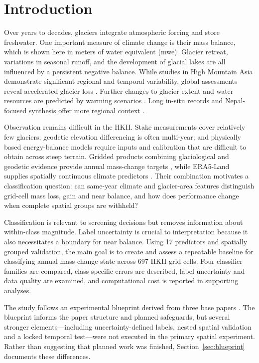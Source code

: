 \documentclass[conference]{IEEEtran}
\begin{document}
\section{Introduction}
Over years to decades, glaciers integrate atmospheric forcing and store freshwater. One important measure of climate change is their mass balance, which is shown here in meters of water equivalent (mwe). Glacier retreat, variations in seasonal runoff, and the development of glacial lakes are all influenced by a persistent negative balance. While studies in High Mountain Asia demonstrate significant regional and temporal variability, global assessments reveal accelerated glacier loss \cite{hugonnet2021,miles2021,bhattacharya2021,barandun2021}. Further changes to glacier extent and water resources are predicted by warming scenarios \cite{rounce2023}. Long in-situ records and Nepal-focused synthesis offer more regional context \cite{khadka2023,stumm2021}.

Observation remains difficult in the HKH. Stake measurements cover relatively few glaciers; geodetic elevation differencing is often multi-year; and physically based energy-balance models require inputs and calibration that are difficult to obtain across steep terrain. Gridded products combining glaciological and geodetic evidence provide annual mass-change targets \cite{wgmsgrid,dussaillant2024}, while ERA5-Land supplies spatially continuous climate predictors \cite{era5landpaper,era5land}. Their combination motivates a classification question: can same-year climate and glacier-area features distinguish grid-cell mass loss, gain and near balance, and how does performance change when complete spatial groups are withheld?

Classification is relevant to screening decisions but removes information about within-class magnitude. Label uncertainty is crucial to interpretation because it also necessitates a boundary for near balance. Using 17 predictors and spatially grouped validation, the main goal is to create and assess a repeatable baseline for classifying annual mass-change state across 697 HKH grid cells. Four classifier families are compared, class-specific errors are described, label uncertainty and data quality are examined, and computational cost is reported in supporting analyses.

The study follows an experimental blueprint derived from three base papers \cite{gurung2025,khadka2023,anilkumar2023}. The blueprint informs the paper structure and planned safeguards, but several stronger elements—including uncertainty-defined labels, nested spatial validation and a locked temporal test—were not executed in the primary spatial experiment. Rather than suggesting that planned work was finished, Section~\ref{sec:blueprint} documents these differences.
\end{document}

